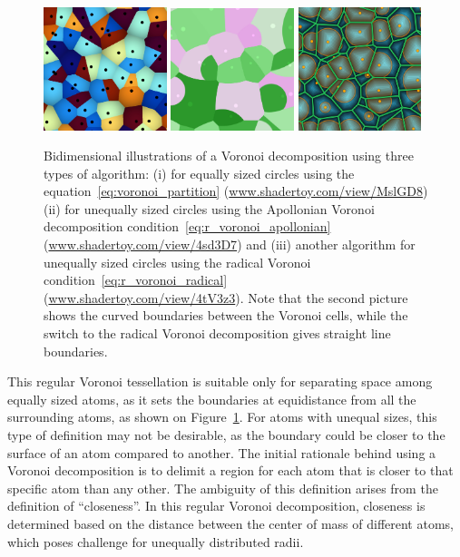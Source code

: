 \documentclass[main]{subfiles}
\begin{document}
\begin{figure}[ht]
  \centering
  \includegraphics[width=0.32\textwidth]{figures/3-fastsim/voronoi.jpg}
  \includegraphics[width=0.32\textwidth]{figures/3-fastsim/voronoi_apollonian.jpg}
  \includegraphics[width=0.32\textwidth]{figures/3-fastsim/voronoi_radical.jpg}
  \caption{Bidimensional illustrations of a Voronoi decomposition using three types of algorithm: (i) for equally sized circles using the equation~\ref{eq:voronoi_partition} (\url{www.shadertoy.com/view/MslGD8}) (ii) for unequally sized circles using the Apollonian Voronoi decomposition condition~\ref{eq:r_voronoi_apollonian} (\url{www.shadertoy.com/view/4sd3D7}) and (iii) another algorithm for unequally sized circles using the radical Voronoi condition~\ref{eq:r_voronoi_radical} (\url{www.shadertoy.com/view/4tV3z3}). Note that the second picture shows the curved boundaries between the Voronoi cells, while the switch to the radical Voronoi decomposition gives straight line boundaries.}\label{fgr:voronoi_illustration}
\end{figure}

This regular Voronoi tessellation is suitable only for separating space among equally sized atoms, as it sets the boundaries at equidistance from all the surrounding atoms, as shown on Figure~\ref{fgr:voronoi_illustration}. For atoms with unequal sizes, this type of definition may not be desirable, as the boundary could be closer to the surface of an atom compared to another. The initial rationale behind using a Voronoi decomposition is to delimit a region for each atom that is closer to that specific atom than any other. The ambiguity of this definition arises from the definition of ``closeness''. In this regular Voronoi decomposition, closeness is determined based on the distance between the center of mass of different atoms, which poses challenge for unequally distributed radii.
\end{document}

